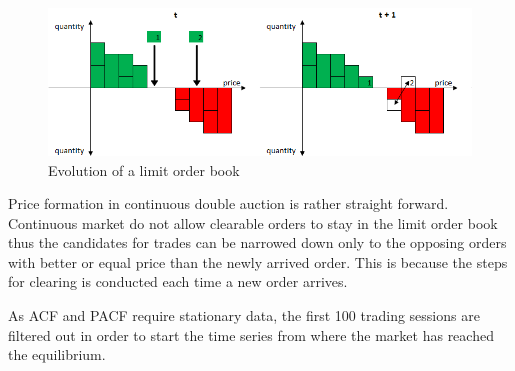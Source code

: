\begin{figure}
    \begin{center}  
        \includegraphics[width=15cm]{diagrams/lob_evolution.png}
        \caption{Evolution of a limit order book}
        \label{fig:lob_evo}
    \end{center}
\end{figure}

Price formation in continuous double auction is rather straight forward. Continuous
market do not allow clearable orders to stay in the limit order book thus the
candidates for trades can be narrowed down only to the opposing orders with better
or equal price than the newly arrived order. This is because the steps for 
clearing is conducted each time a new order arrives.



As ACF and PACF require stationary data, the 
first 100 trading sessions are filtered out in order to start the time series from where
the market has reached the equilibrium.





